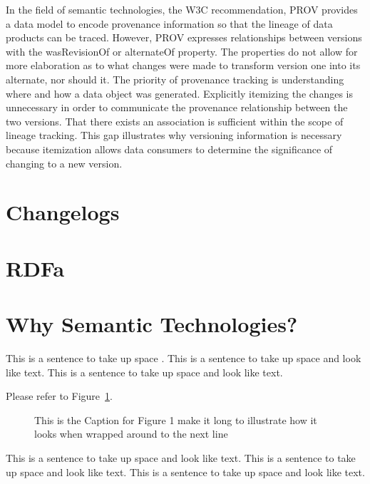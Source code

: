 In the field of semantic technologies, the W3C recommendation, PROV provides a data model to encode provenance information so that the lineage of data products can be traced.  However, PROV expresses relationships between versions with the wasRevisionOf or alternateOf property.  The properties do not allow for more elaboration as to what changes were made to transform version one into its alternate, nor should it.  The priority of provenance tracking is understanding where and how a data object was generated.  Explicitly itemizing the changes is unnecessary in order to communicate the provenance relationship between the two versions.  That there exists an association is sufficient within the scope of lineage tracking.  This gap illustrates why versioning information is necessary because itemization allows data consumers to determine the significance of changing to a new version.

\section{Changelogs}

\section{RDFa}

\section{Why Semantic Technologies?}

This is a sentence to take up space \cite{thisbook}.
This is a sentence to take up space and look like text.
This is a sentence to take up space and look like text.

Please refer to Figure~\ref{myfig}.  %

\begin{figure}
\centering
\vspace{2.0in} %
\caption{This is the Caption for Figure 1 make it long to illustrate
how it looks when wrapped around to the next line}
\label{myfig}  %
\end{figure}

This is a sentence to take up space and look like text.
This is a sentence to take up space and look like text.
This is a sentence to take up space and look like text.

